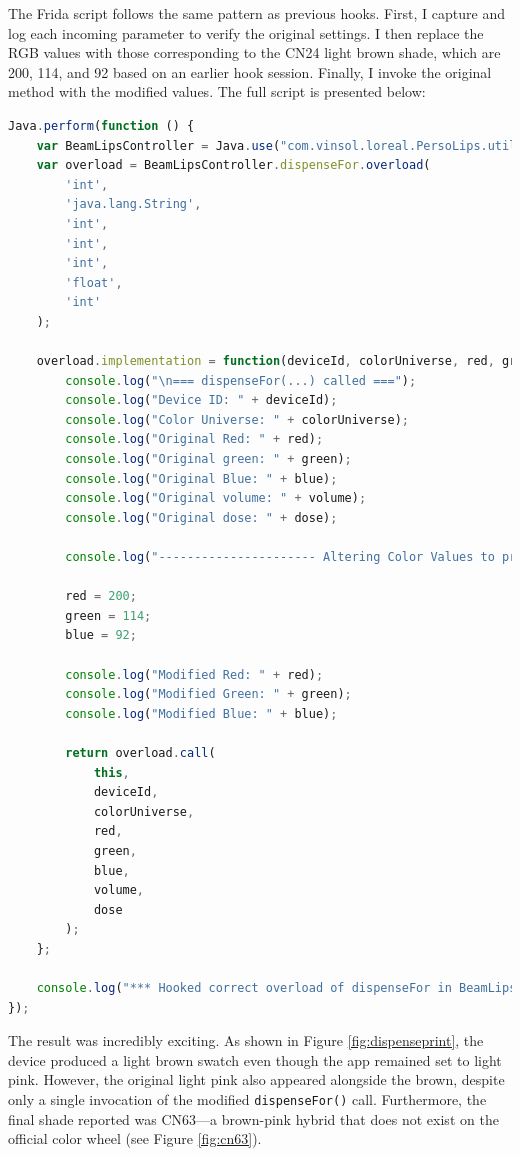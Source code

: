 The Frida script follows the same pattern as previous hooks. First, I capture and log each incoming parameter to verify the original settings. I then replace the RGB values with those corresponding to the CN24 light brown shade, which are 200, 114, and 92 based on an earlier hook session. Finally, I invoke the original method with the modified values. The full script is presented below:
\begin{lstlisting}[language=JavaScript, breaklines=true]
Java.perform(function () {
    var BeamLipsController = Java.use("com.vinsol.loreal.PersoLips.utils.BeamLipsController");
    var overload = BeamLipsController.dispenseFor.overload(
        'int',
        'java.lang.String',
        'int',
        'int',
        'int',
        'float',
        'int'
    );
    
    overload.implementation = function(deviceId, colorUniverse, red, green, blue, volume, dose) {
        console.log("\n=== dispenseFor(...) called ===");
        console.log("Device ID: " + deviceId);
        console.log("Color Universe: " + colorUniverse);
        console.log("Original Red: " + red);
        console.log("Original green: " + green);
        console.log("Original Blue: " + blue);
        console.log("Original volume: " + volume);
        console.log("Original dose: " + dose);
        
        console.log("---------------------- Altering Color Values to print CN24 -------------------------");
        
        red = 200;
        green = 114;
        blue = 92;
        
        console.log("Modified Red: " + red);
        console.log("Modified Green: " + green);
        console.log("Modified Blue: " + blue);
        
        return overload.call(
            this,
            deviceId,
            colorUniverse,
            red,
            green,
            blue,
            volume,
            dose
        );
    };
    
    console.log("*** Hooked correct overload of dispenseFor in BeamLipsController ***");
});
\end{lstlisting}
The result was incredibly exciting. As shown in Figure \ref{fig:dispenseprint}, the device produced a light brown swatch even though the app remained set to light pink. However, the original light pink also appeared alongside the brown, despite only a single invocation of the modified \texttt{dispenseFor()} call. Furthermore, the final shade reported was CN63—a brown-pink hybrid that does not exist on the official color wheel (see Figure \ref{fig:cn63}).
